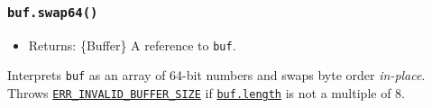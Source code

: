 \begin{Shaded}
\begin{Highlighting}[]
\NormalTok{ \{ }\NormalTok{ \} }\OperatorTok{=} \NormalTok{(}\NormalTok{)}\OperatorTok{;}

\OperatorTok{=} \NormalTok{([}\OperatorTok{,} \OperatorTok{,} \OperatorTok{,} \OperatorTok{,} \OperatorTok{,} \OperatorTok{,} \OperatorTok{,} \NormalTok{])}\OperatorTok{;}

\OperatorTok{;}

\NormalTok{()}\OperatorTok{;}

\OperatorTok{;}

\OperatorTok{=} \NormalTok{([}\OperatorTok{,} \OperatorTok{,} \NormalTok{])}\OperatorTok{;}

\NormalTok{()}\OperatorTok{;}
\end{Highlighting}
\end{Shaded}

\subsubsection{\texorpdfstring{\texttt{buf.swap64()}}{buf.swap64()}}\label{buf.swap64}

\begin{itemize}
\tightlist
\item
  Returns: \{Buffer\} A reference to \texttt{buf}.
\end{itemize}

Interprets \texttt{buf} as an array of 64-bit numbers and swaps byte
order \emph{in-place}. Throws
\href{errors.md\#err_invalid_buffer_size}{\texttt{ERR\_INVALID\_BUFFER\_SIZE}}
if \hyperref[buflength]{\texttt{buf.length}} is not a multiple of 8.

